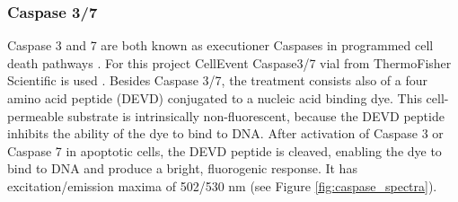 \documentclass[pdftex,12pt,a4paper]{report}
\begin{document}
\subsubsection*{Caspase 3/7}

Caspase 3 and 7 are both known as executioner Caspases in programmed cell death pathways \cite{alberts2017molecular}. For this project CellEvent Caspase3/7 vial from ThermoFisher Scientific is used  \cite{thermofisher2018casp}. Besides Caspase 3/7, the treatment consists also of a four amino acid peptide (DEVD) conjugated to a nucleic acid binding dye. This cell-permeable substrate is intrinsically non-fluorescent, because the DEVD peptide inhibits the ability of the dye to bind to DNA. After activation of Caspase 3 or Caspase 7 in apoptotic cells, the DEVD peptide is cleaved, enabling the dye to bind to DNA and produce a bright, fluorogenic response.  It has excitation/emission maxima of 502/530 nm (see Figure \ref{fig:caspase_spectra}).
\end{document}
